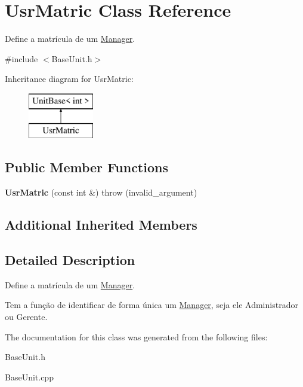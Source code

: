 \hypertarget{classUsrMatric}{\section{Usr\-Matric Class Reference}
\label{classUsrMatric}
}


Define a matrícula de um \hyperlink{classManager}{Manager}.  




{\ttfamily \#include $<$Base\-Unit.\-h$>$}

Inheritance diagram for Usr\-Matric\-:\begin{figure}[H]
\begin{center}
\leavevmode
\includegraphics[height=2.000000cm]{classUsrMatric}
\end{center}
\end{figure}
\subsection*{Public Member Functions}
\begin{DoxyCompactItemize}
\item 
\hypertarget{classUsrMatric_acc7320dcfc8978fe9cc142340adb99c1}{{\bfseries Usr\-Matric} (const int \&)  throw (invalid\-\_\-argument)}\label{classUsrMatric_acc7320dcfc8978fe9cc142340adb99c1}

\end{DoxyCompactItemize}
\subsection*{Additional Inherited Members}


\subsection{Detailed Description}
Define a matrícula de um \hyperlink{classManager}{Manager}. 

Tem a função de identificar de forma única um \hyperlink{classManager}{Manager}, seja ele Administrador ou Gerente. 

The documentation for this class was generated from the following files\-:\begin{DoxyCompactItemize}
\item 
Base\-Unit.\-h\item 
Base\-Unit.\-cpp\end{DoxyCompactItemize}
